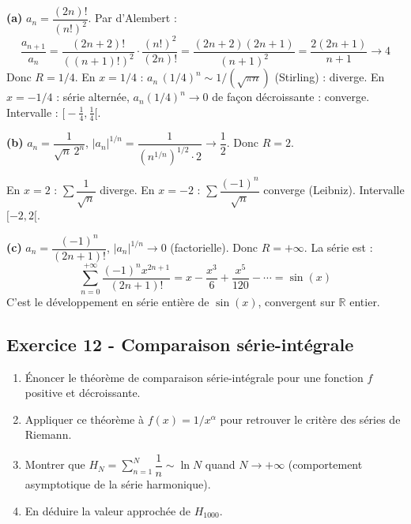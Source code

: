 \documentclass[12pt,a4paper]{article}
\begin{document}
\begin{boitecorrige}
\textbf{(a)} $a_n = \dfrac{(2n)!}{(n!)^2}$. Par d'Alembert :
\[
\frac{a_{n+1}}{a_n} = \frac{(2n+2)!}{((n+1)!)^2}\cdot\frac{(n!)^2}{(2n)!} = \frac{(2n+2)(2n+1)}{(n+1)^2} = \frac{2(2n+1)}{n+1} \to 4
\]
Donc $R = 1/4$. En $x = 1/4$ : $a_n\,(1/4)^n \sim 1/(\sqrt{\pi n})$ (Stirling) : diverge. En $x = -1/4$ : série alternée, $a_n(1/4)^n \to 0$ de façon décroissante : converge. Intervalle : $\bigl[-\frac{1}{4}, \frac{1}{4}\bigr[$.

\textbf{(b)} $a_n = \dfrac{1}{\sqrt{n}\,2^n}$, $|a_n|^{1/n} = \dfrac{1}{(n^{1/n})^{1/2}\cdot2} \to \dfrac{1}{2}$. Donc $R = 2$.

En $x = 2$ : $\sum \dfrac{1}{\sqrt{n}}$ diverge. En $x = -2$ : $\sum \dfrac{(-1)^n}{\sqrt{n}}$ converge (Leibniz). Intervalle $[-2, 2[$.

\textbf{(c)} $a_n = \dfrac{(-1)^n}{(2n+1)!}$, $|a_n|^{1/n} \to 0$ (factorielle). Donc $R = +\infty$. La série est :
\[
\sum_{n=0}^{+\infty}\frac{(-1)^n x^{2n+1}}{(2n+1)!} = x - \frac{x^3}{6} + \frac{x^5}{120} - \cdots = \boxed{\sin(x)}
\]
C'est le développement en série entière de $\sin(x)$, convergent sur $\mathbb{R}$ entier.
\end{boitecorrige}

\subsection*{Exercice 12 - Comparaison série-intégrale \niveau{\moyen}}

\begin{boiteexercice}
\begin{enumerate}
  \item Énoncer le théorème de comparaison série-intégrale pour une fonction $f$ positive et décroissante.
  \item Appliquer ce théorème à $f(x) = 1/x^\alpha$ pour retrouver le critère des séries de Riemann.
  \item Montrer que $H_N = \sum_{n=1}^N \dfrac{1}{n} \sim \ln N$ quand $N\to+\infty$ (comportement asymptotique de la série harmonique).
  \item En déduire la valeur approchée de $H_{1000}$.
\end{enumerate}
\end{boiteexercice}
\end{document}
